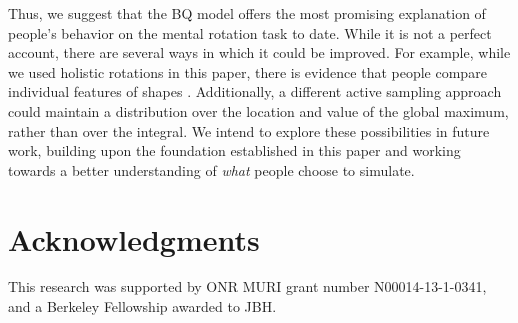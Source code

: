 \documentclass[10pt,letterpaper]{article}
\newcommand{\Bq}[0]{BQ}
\begin{document}
Thus, we suggest that the \Bq{} model offers the most promising
explanation of people's behavior on the mental rotation task to
date. While it is not a perfect account, there are several ways in
which it could be improved. For example, while we used holistic
rotations in this paper, there is evidence that people compare
individual features of shapes
\cite{Just1976,Yuille:1982tx}. Additionally, a different active
sampling approach could maintain a distribution over the location and
value of the global maximum, rather than over the integral. We intend
to explore these possibilities in future work, building upon the
foundation established in this paper and working towards a better
understanding of \textit{what} people choose to simulate.



\section{Acknowledgments} {\small This research was supported by ONR
  MURI grant number N00014-13-1-0341, and a Berkeley Fellowship
  awarded to JBH. }


\renewcommand{\bibliographytypesize}{\small}
\setlength{\bibleftmargin}{.125in}
\setlength{\bibindent}{-\bibleftmargin}

\end{document}
